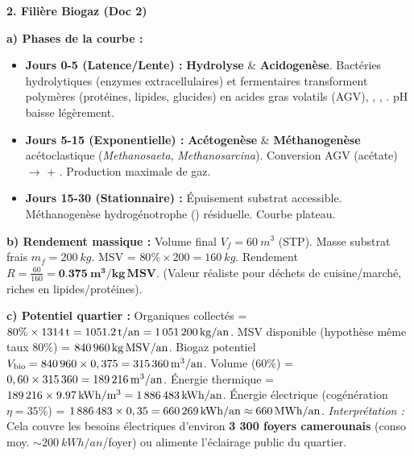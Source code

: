 \documentclass[11pt]{article}
\begin{document}
\begin{exoresolu}
\medskip
\noindent \textbf{2. Filière Biogaz (Doc 2)}
\par
\textbf{a) Phases de la courbe :}
\begin{itemize}
    \item \textbf{Jours 0-5 (Latence/Lente) :} \textbf{Hydrolyse} \& \textbf{Acidogenèse}. Bactéries hydrolytiques (enzymes extracellulaires) et fermentaires transforment polymères (protéines, lipides, glucides) en acides gras volatils (AGV), , , . pH baisse légèrement.
    \item \textbf{Jours 5-15 (Exponentielle) :} \textbf{Acétogenèse} \& \textbf{Méthanogenèse} acétoclastique (\textit{Methanosaeta}, \textit{Methanosarcina}). Conversion AGV (acétate) $\to$  + . Production maximale de gaz.
    \item \textbf{Jours 15-30 (Stationnaire) :} Épuisement substrat accessible. Méthanogenèse hydrogénotrophe () résiduelle. Courbe plateau.
\end{itemize}
\par
\textbf{b) Rendement massique :}
Volume final $V_f = \SI{60}{m^3}$ (STP).
Masse substrat frais $m_f = \SI{200}{kg}$. MSV = $80\% \times 200 = \SI{160}{kg}$.
Rendement $R = \frac{60}{160} = \mathbf{\SI{0,375}{m^3/kg\,MSV}}$. (Valeur réaliste pour déchets de cuisine/marché, riches en lipides/protéines).
\par
\textbf{c) Potentiel quartier :}
Organiques collectés = $80\% \times \SI{1\,314}{t} = \SI{1\,051,2}{t/an} = \SI{1\,051\,200}{kg/an}$.
MSV disponible (hypothèse même taux $80\%$) = $\SI{840\,960}{kg\,MSV/an}$.
Biogaz potentiel $V_{\text{bio}} = 840\,960 \times 0,375 = \mathbf{\SI{315\,360}{m^3/an}}$.
Volume  ($60\%$) = $0,60 \times 315\,360 = \SI{189\,216}{m^3/an}$.
Énergie thermique  = $189\,216 \times \SI{9,97}{kWh/m^3} = \SI{1\,886\,483}{kWh/an}$.
Énergie électrique (cogénération $\eta = 35\%$) = $1\,886\,483 \times 0,35 = \mathbf{\SI{660\,269}{kWh/an} \approx \SI{660}{MWh/an}}$.
\emph{Interprétation :} Cela couvre les besoins électriques d'environ \textbf{3 300 foyers camerounais} (conso moy. $\sim \SI{200}{kWh/an}$/foyer) ou alimente l'éclairage public du quartier.


\end{exoresolu}
\end{document}
